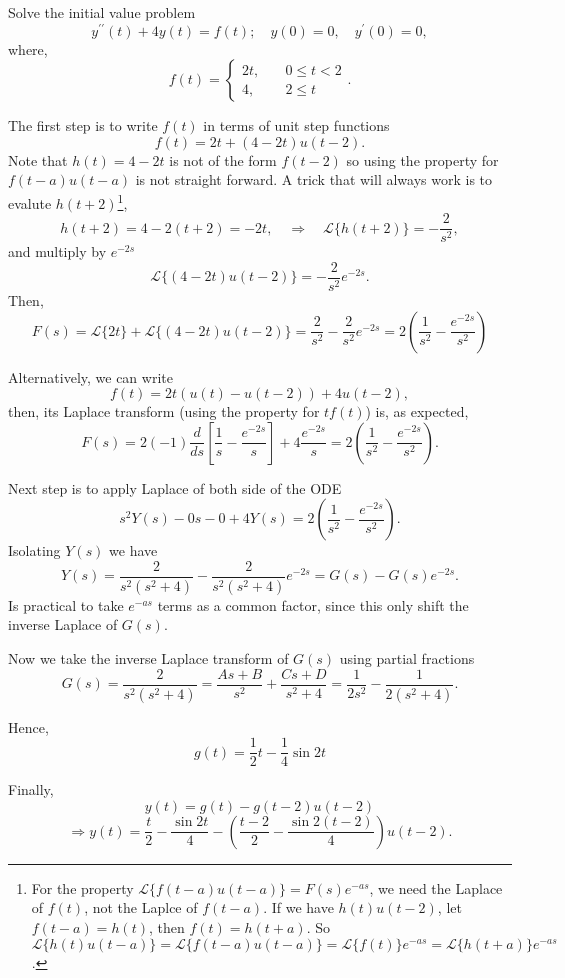 \documentclass[11pt]{article}
\begin{document}
\begin{problem}
Solve the initial value problem
\begin{equation*}
y^{\prime \prime}(t)+4y(t)=f(t); \quad y(0)=0, \quad y^{\prime}(0) = 0,
\end{equation*}
where,
\begin{equation*}
f(t) = \begin{cases} 
2t, &\quad 0\leq t<2 \\
4, &\quad 2 \leq t 
\end{cases}.
\end{equation*}
\end{problem}

\begin{solution}
The first step is to write $f(t)$ in terms of unit step functions
\[f(t)=2t+ (4 - 2t)u(t-2).\]
Note that $h(t)=4 -2t$ is not of the form $f(t-2)$ so using the property for $f(t-a)u(t-a)$ is not straight forward. A trick that will always work is to evalute $h(t+2)$\footnote{For the property $\mathcal{L}\{f(t-a)u(t-a)\}=F(s)e^{-as}$, we need the Laplace of $f(t)$, not the Laplce of $f(t-a)$. If we have $h(t)u(t-2)$, let $f(t-a)=h(t)$, then $f(t)=h(t+a)$. So $\mathcal{L}\{h(t)u(t-a)\}=\mathcal{L}\{f(t-a)u(t-a)\}=\mathcal{L}\{f(t)\}e^{-as}=\mathcal{L}\{h(t+a)\}e^{-as}$.},
\[h(t+2)=4-2(t+2)=-2t,\quad  \Rightarrow \quad \mathcal{L}\{h(t+2)\}=-\frac{2}{s^2},\]
and multiply by $e^{-2s}$
\[\mathcal{L}\{(4-2t)u(t-2)\} = -\frac{2}{s^2}e^{-2s}.\]
Then,
\[F(s)= \mathcal{L}\{2t\} + \mathcal{L}\{(4-2t)u(t-2)\}= \frac{2}{s^2} - \frac{2}{s^{2}}e^{-2s}=2\left( \frac{1}{s^2} - \frac{e^{-2s}}{s^{2}} \right)\]

Alternatively, we can write 
\[f(t)=2t(u(t)-u(t-2))+4u(t-2),\]
then, its Laplace transform (using the property for $tf(t)$) is, as expected,
\[F(s)=2(-1)\frac{d}{ds}\left[ \frac{1}{s} - \frac{e^{-2s}}{s} \right] + 4 \frac{e^{-2s}}{s} = 2 \left( \frac{1}{s^{2}} - \frac{e^{-2s}}{s^{2}} \right).\]


Next step is to apply Laplace of both side of the ODE
\[s^{2}Y(s) -0s-0+ 4 Y(s)=2 \left( \frac{1}{s^{2}} - \frac{e^{-2s}}{s^{2}} \right).\]
Isolating $Y(s)$ we have
\[Y(s)=\frac{2}{s^{2}(s^{2}+4)}- \frac{2}{s^{2}(s^{2}+4)} e^{-2s}=G(s) -G(s)e^{-2s}.\]
Is practical to take $e^{-as}$ terms as a common factor, since this only shift the inverse Laplace of $G(s)$.

Now we take the inverse Laplace transform of $G(s)$ using partial fractions
\[G(s)=\frac{2}{s^{2}(s^{2}+4)}=\frac{As+B}{s^{2}}+\frac{Cs+D}{s^{2}+4}= \frac{1}{2s^{2}}-\frac{1}{2(s^{2}+4)}.\]

Hence,
\[g(t)=\frac{1}{2}t-\frac{1}{4}\sin 2t\]

Finally,
\[y(t)=g(t)-g(t-2)u(t-2)\]
\[\Rightarrow \boxed{y(t)=\frac{t}{2}-\frac{\sin 2t}{4}- \left(\frac{t-2}{2}-\frac{\sin 2(t-2)}{4}\right)u(t-2)}.\]
\end{solution}
\end{document}
